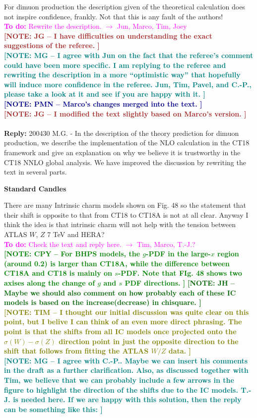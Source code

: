 \documentclass[aps,prd,amsmath,nofootinbib,floatfix,fleqn]{revtex4}
\newcommand{\TODO}[1]{\textcolor{magenta}{
\quad\vspace{3pt} \\ {\bf To do:} #1 \\
}}
\newcommand{\REPLY}[1]{\textcolor{redish}{\quad \\
{\bf Reply:} #1 \\
}}
\newcommand{\NOTECPY}[1]{\textcolor{green}{ \bf[NOTE: CPY -- #1 ]}}
\newcommand{\NOTEJH}[1]{\textcolor{darkgreen}{ \bf[NOTE: JH -- #1 ]}}
\newcommand{\NOTEPN}[1]{\textcolor{darkblue}{ \bf[NOTE: PMN -- #1 ]}}
\newcommand{\NOTETIM}[1]{\textcolor{olive}{ \bf[NOTE: TIM -- #1 ]}}
\newcommand{\NOTEJG}[1]{\textcolor{brown}{ \bf[NOTE: JG -- #1 ]}}
\newcommand{\NOTEMG}[1]{\textcolor{teal}{ \bf[NOTE: MG -- #1 ]}}
\begin{document}
\noindent
For dimuon production the description given of the theoretical calculation does not inspire confidence, frankly. Not that this is any fault of the authors!  
\TODO{Rewrite the description. $\to$ Jun, Marco, Tim, Joey}
\NOTEJG{I have difficulties on understanding the exact suggestions of the referee.}\\
\NOTEMG{I agree with Jun on the fact that the referee's comment could have been more specific.
I am replying to the referee and rewriting the description in a more ``optimistic way'' that hopefully will induce more confidence in the referee.
Jun, Tim, Pavel, and C.-P., please take a look at it and see if you are happy with it.}\\
\NOTEPN{Marco's changes merged into the text.}\\
\NOTEJG{I modified the text slightly based on Marco's version.}\\
\REPLY{200430 M.G. - In the description of the theory prediction for dimuon production, we describe the implementation of the NLO calculation in the CT18 framework and give an
explanation on why we believe it is trustworthy in the CT18 NNLO global analysis. We have improved the discussion by rewriting the text in several parts.}


{\bf Standard Candles}

There are many Intrinsic charm models shown on Fig. 48 so the statement that their shift is opposite to that from CT18 to CT18A is not at all clear. Anyway I think the idea is that intrinsic charm will not help with the tension between ATLAS $W$, $Z$ 7 TeV and HERA?  
\TODO{Check the text and reply here. $\to$ Tim, Marco, T.-J.?}
\NOTECPY{For BHPS models, the $g$-PDF in the large-$x$ region (around 0.2) is larger than CT18A, while the difference between CT18A and CT18 is mainly on $s$-PDF. Note that FIg. 48 shows two axises along the change of $g$ and $s$ PDF directions.}
\NOTEJH{Maybe we should also comment on how probably each of these IC models is based on the increase(decrease) in chisquare.}\\
%
\NOTETIM{I thought our initial discussion was quite clear on this point, but I belive I can
think of an even more direct phrasing.  The point is that the shifts from all IC models
once projected onto the $\sigma(W)-\sigma(Z)$ direction point in just the opposite
direction to the shift that follows from fitting the ATLAS $W/Z$ data.}\\
\NOTEMG{I agree with C.-P.. Maybe we can insert his comments in the draft as a further clarification.
Also, as discussed together with Tim, we believe that we can probably include a few arrows in the figure to highlight the direction of the shifts due to the IC models.
T.-J. is needed here. If we are happy with this solution, then the reply can be something like this:}
\end{document}
